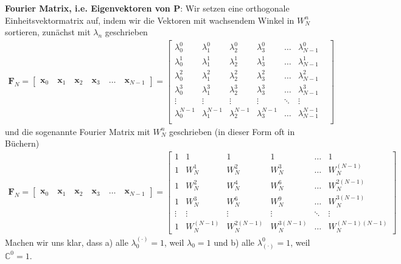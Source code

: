 %

\textbf{Fourier Matrix, i.e. Eigenvektoren von $\bm{P}$}:
Wir setzen eine orthogonale Einheitsvektormatrix
auf, indem wir die Vektoren mit
wachsendem Winkel in $W_N^n$ sortieren, zunächst mit $\lambda_n$ geschrieben
\begin{align}
\bm{F}_N =
\begin{bmatrix}
\bm{x}_0 \quad \bm{x}_1 \quad \bm{x}_2 \quad \bm{x}_3 \quad \dots \quad \bm{x}_{N-1}
\end{bmatrix}
=
\begin{bmatrix}
\lambda^0_0 & \lambda^0_1 & \lambda^0_2 & \lambda^0_3 & \dots & \lambda^0_{N-1}\\[1em]
\lambda^1_0 & \lambda^1_1 & \lambda^1_2 & \lambda^1_3 & \dots & \lambda^1_{N-1}\\[1em]
\lambda^2_0 & \lambda^2_1 & \lambda^2_2 & \lambda^2_3 & \dots & \lambda^2_{N-1}\\[1em]
\lambda^3_0 & \lambda^3_1 & \lambda^3_2 & \lambda^3_3 & \dots & \lambda^3_{N-1}\\[1em]
\vdots & \vdots & \vdots &\vdots &\ddots & \vdots\\[1em]
\lambda^{N-1}_0 & \lambda^{N-1}_1 & \lambda^{N-1}_2 & \lambda^{N-1}_3 & \dots & \lambda^{N-1}_{N-1} & \\
\end{bmatrix}
\end{align}
und die sogenannte Fourier Matrix mit $W_N^n$ geschrieben (in dieser Form oft in Büchern)
\begin{align}
\label{eq:DFT_FMatrix_WN}
\bm{F}_N =
\begin{bmatrix}
\bm{x}_0 \quad \bm{x}_1 \quad \bm{x}_2 \quad \bm{x}_3 \quad \dots \quad \bm{x}_{N-1}
\end{bmatrix}
=
\begin{bmatrix}
1 & 1 & 1 & 1 & \dots & 1\\[1em]
1 & W_N^1 & W_N^2 & W_N^3 & \dots & W_N^{(N-1)}\\[1em]
1 & W_N^2 & W_N^4 & W_N^6 & \dots & W_N^{2(N-1)}\\[1em]
1 & W_N^3 & W_N^6 & W_N^9 & \dots & W_N^{3(N-1)}\\[1em]
\vdots & \vdots & \vdots &\vdots &\ddots & \vdots\\[1em]
1 & W_N^{(N-1)} & W_N^{2(N-1)} & W_N^{3(N-1)} & \dots & W_N^{(N-1)(N-1)}
\end{bmatrix}
\end{align}
Machen wir uns klar, dass a) alle $\lambda_0^{(\cdot)} = 1$, weil $\lambda_0=1$
und b) alle $\lambda_{(\cdot)}^0 = 1$, weil $\mathbb{C}^0 = 1$.
%

